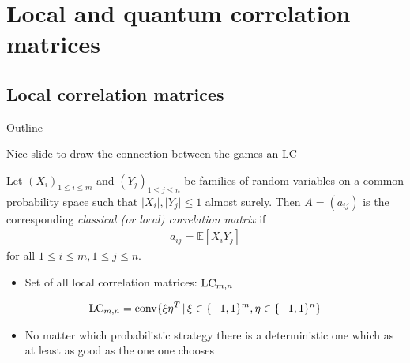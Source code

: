 \section{Local and quantum correlation matrices}
\subsection{Local correlation matrices }
\begin{frame}{Outline}
\tableofcontents[currentsection]
\end{frame}
\begin{frame}
	Nice slide to draw the connection between the games an LC 
\end{frame}

\begin{frame}
	\begin{definition}
		Let $ (X_i)_{1 \le i \le m } $ and $ (Y_j)_{1 \le j \le n} $ be families of random variables on a common probability space such that $ \vert X_i \vert, \vert Y_j \vert \le 1 $ almost surely. Then $ A=(a_{ij}) $ is the corresponding {\itshape classical (or local) correlation matrix} if 
		\begin{align*}
		a_{ij} = \mathbb{E}[X_iY_j]
		\end{align*}
		for all $ 1 \le i \le m, 1 \le j \le n $.
	\end{definition}
	\pause
	\begin{itemize}
		\item Set of all local correlation matrices: $ \textup{LC}_{m,n} $
	\end{itemize}
	\pause
	\begin{lemma}
		\begin{align*}
			\textup{LC}_{m,n} = \textup{conv} \{  \xi\eta^T \, | \, \xi \in \{-1,1\}^m, \eta \in \{-1,1\}^n     \}
		\end{align*}
		
	\end{lemma}
	\begin{itemize}
		\item No matter which probabilistic strategy there is a deterministic one which as at least as good as the one one chooses 
	\end{itemize}
\end{frame}

